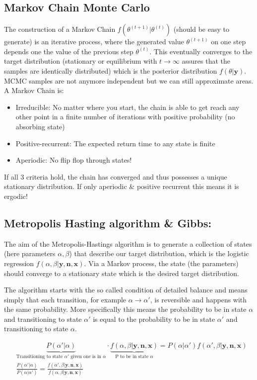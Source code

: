 \documentclass{article}\usepackage[]{graphicx}\usepackage[]{xcolor}
\begin{document}
\begin{multicols*}{2}
\section{Markov Chain Monte Carlo}
The construction of a Markov Chain $f(\theta^{(t+1)}|\theta^{(t)})$ (should be easy to generate) is an iterative process, where the generated value $\theta^{(t+1)}$ on one step depends one the value of the previous step $\theta^{(t)}$. This eventually converges to the target distribution (stationary or equilibrium with $t\rightarrow\infty$ assures that the samples are identically distributed) which is the posterior distribution $f(\theta|\boldsymbol{y})$. MCMC samples are not anymore independent but we can still approximate areas. A Markov Chain is:
\begin{itemize}
\item Irreducible: No matter where you start, the chain is able to get reach any other point in a finite number of iterations with positive probability (no absorbing state)
\item Positive-recurrent: The expected return time to any state is finite
\item Aperiodic: No flip flop through states! 
\end{itemize}
If all 3 criteria hold, the chain has converged and thus possesses a unique stationary distribution. If only aperiodic \& positive recurrent  this means it is ergodic!
\subsection{Metropolis Hasting algorithm \& Gibbs:}
The aim of the Metropolis-Hastings algorithm is to generate a collection of states (here parameters $\alpha,\beta$) that describe our target distribution, which is the logistic regression $f(\alpha,\beta|\boldsymbol{y,n,x})$. Via a Markov process, the state (the parameters) should converge to a stationary state which is the desired target distribution.

The algorithm starts with the so called condition of detailed balance and means simply that each transition, for example $\alpha\rightarrow\alpha'$, is reversible and happens with the same probability. More specifically this means the probability to be in state $\alpha$ and transitioning to state $\alpha'$ is equal to the probability to be in state $\alpha'$ and transitioning to state $\alpha$.

\begin{align*}
&\underbrace{P(\alpha'|\alpha)}_{\text{Transitioning to state }\alpha'\text{ given one is in }\alpha}\cdot\underbrace{f(\alpha,\beta|\boldsymbol{y,n,x})}_{\text{P to be in state }\alpha}=P(\alpha|\alpha')f(\alpha',\beta|\boldsymbol{y,n,x})\\
&\frac{P(\alpha'|\alpha)}{P(\alpha|\alpha')}=\frac{f(\alpha',\beta|\boldsymbol{y,n,x})}{f(\alpha,\beta|\boldsymbol{y,n,x})}
\end{align*}


\end{multicols*}
\end{document}
